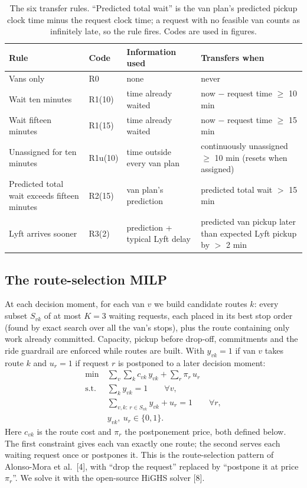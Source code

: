 \documentclass{article}
\begin{document}
\begin{table}[t]
\centering\small
\caption{The six transfer rules. ``Predicted total wait'' is the van plan's predicted pickup clock time minus the request clock time; a request with no feasible van counts as infinitely late, so the rule fires. Codes are used in figures.}\label{tab:rules}
\begin{tabularx}{\textwidth}{@{}P{4.6cm}P{1.3cm}P{3.6cm}L@{}}
\toprule
\textbf{Rule} & \textbf{Code} & \textbf{Information used} & \textbf{Transfers when}\\
\midrule
Vans only & R0 & none & never\\
Wait ten minutes & R1(10) & time already waited & now $-$ request time $\ge$ 10 min\\
Wait fifteen minutes & R1(15) & time already waited & now $-$ request time $\ge$ 15 min\\
Unassigned for ten minutes & R1u(10) & time outside every van plan & continuously unassigned $\ge$ 10 min (resets when assigned)\\
Predicted total wait exceeds fifteen minutes & R2(15) & van plan's prediction & predicted total wait $>$ 15 min\\
Lyft arrives sooner & R3(2) & prediction + typical Lyft delay & predicted van pickup later than expected Lyft pickup by $>$ 2 min\\
\bottomrule
\end{tabularx}
\end{table}

\subsection{The route-selection MILP}\label{sec:milp}
At each decision moment, for each van $v$ we build candidate routes $k$: every subset $S_{vk}$ of at most $K=3$ waiting requests, each placed in its best stop order (found by exact search over all the van's stops), plus the route containing only work already committed. Capacity, pickup before drop-off, commitments and the ride guardrail are enforced while routes are built. With $y_{vk}=1$ if van $v$ takes route $k$ and $u_r=1$ if request $r$ is postponed to a later decision moment:
\begin{equation}
\begin{aligned}
\min\ & \textstyle\sum_{v}\sum_{k} c_{vk}\, y_{vk} + \sum_{r} \pi_r\, u_r\\
\text{s.t. } & \textstyle\sum_{k} y_{vk} = 1 \qquad \forall v,\\
& \textstyle\sum_{v,k:\, r \in S_{vk}} y_{vk} + u_r = 1 \qquad \forall r,\\
& y_{vk},\ u_r \in \{0,1\}.
\end{aligned}\label{eq:milp}
\end{equation}
Here $c_{vk}$ is the route cost and $\pi_r$ the postponement price, both defined below. The first constraint gives each van exactly one route; the second serves each waiting request once or postpones it. This is the route-selection pattern of Alonso-Mora et al.\ [4], with ``drop the request'' replaced by ``postpone it at price $\pi_r$''. We solve it with the open-source HiGHS solver [8].
\end{document}
